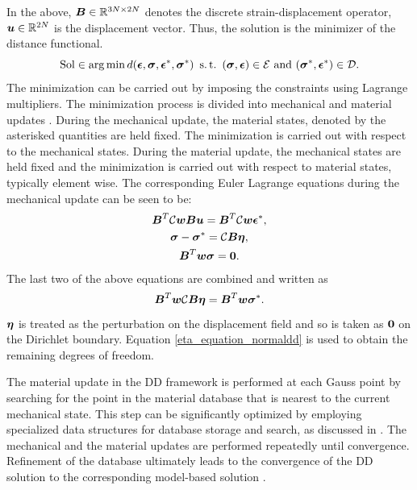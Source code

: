 \documentclass[10pt,review]{cas-sc}
\begin{document}
In the above, $\mbox{\boldmath $B$} \in \mathbb{R}^{3N\times 2N}$ denotes the discrete strain-displacement operator, $\mbox{\boldmath $u$} \in \mathbb{R}^{2N}$ is the displacement vector. Thus, the solution is the minimizer of the distance functional.
\begin{equation}
	{\rm Sol} \in \arg \min d(\mbox{\boldmath $\epsilon$},\mbox{\boldmath $\sigma$},\mbox{\boldmath $\epsilon$}^*,\mbox{\boldmath $\sigma$}^*) \text{ } \operatorname{s.t.} \text{ } (\mbox{\boldmath $\sigma$} , \mbox{\boldmath $\epsilon$}) \in  \mathcal{E} \text{ and } (\mbox{\boldmath $\sigma$}^* , \mbox{\boldmath $\epsilon$}^*) \in  \mathcal{D}.
\end{equation}
The minimization can be carried out by imposing the constraints using Lagrange multipliers. The minimization process is divided into mechanical and material updates \cite{Kirchdoerfer2016}. During the mechanical update, the material states, denoted by the asterisked quantities are held fixed. The minimization is carried out with respect to the mechanical states. During the material update, the mechanical states are held fixed and the minimization is carried out with respect to material states, typically element wise.
The corresponding Euler Lagrange equations during the mechanical update can be seen to be:
%
\begin{gather}
	\mbox{\boldmath $B$}^T \mathcal{C}\mbox{\boldmath $w$} \mbox{\boldmath $B$} \mbox{\boldmath $u$} = \mbox{\boldmath $B$}^T \mathcal{C}\mbox{\boldmath $w$} \mbox{\boldmath $\epsilon$}^*, \label{disp_equation_normaldd}\\
	\mbox{\boldmath $\sigma$} - \mbox{\boldmath $\sigma$}^* =  \mathcal{C} \mbox{\boldmath $B$} \mbox{\boldmath $\eta$}, \\
	\mbox{\boldmath $B$}^T \mbox{\boldmath $w$}\mbox{\boldmath $\sigma$} = \mathbf{0}.
\end{gather}
%
The last two of the above equations are combined and written as 
\begin{equation}
 \mbox{\boldmath $B$}^T \mbox{\boldmath $w$}\mathcal{C} \mbox{\boldmath $B$} \mbox{\boldmath $\eta$} = \mbox{\boldmath $B$}^T \mbox{\boldmath $w$}\mbox{\boldmath $\sigma$}^*. \label{eta_equation_normaldd}
\end{equation}
$\mbox{\boldmath $\eta$}$ is treated as the perturbation on the displacement field and so is taken as $\bf0$ on the Dirichlet boundary. Equation \eqref{eta_equation_normaldd} is used to obtain the remaining degrees of freedom.

The material update in the DD framework is performed at each Gauss point by searching for the point in the material database that is nearest to the current mechanical state. This step can be significantly optimized by employing specialized data structures for database storage and search, as discussed in \cite{Eggersmann2021}. The mechanical and the material updates are performed repeatedly until convergence. Refinement of the database ultimately leads to the convergence of the DD solution to the corresponding model-based solution \cite{Conti2018}.
\end{document}

